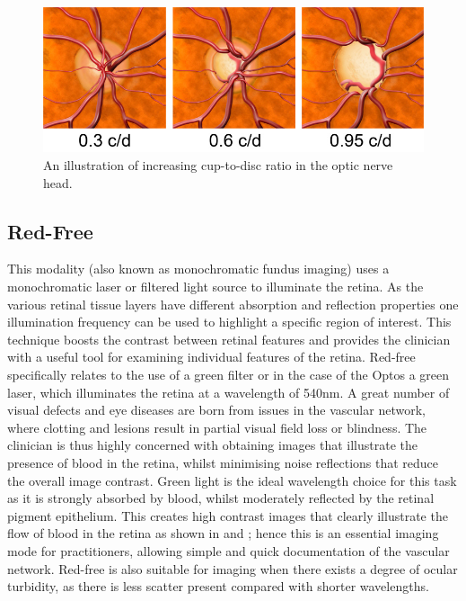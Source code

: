 \begin{figure}[H]
\centering
\includegraphics{figures/opticnervecupping}
\caption{An illustration of increasing cup-to-disc ratio in the optic nerve head.\cite{7_burnett_hodd_2012}}
\label{fig:cup}
   \end{figure}

	

\subsection{Red-Free}

This modality (also known as monochromatic fundus imaging) uses a
monochromatic \gls{laser} or filtered light source to illuminate the retina.
As the various retinal tissue layers have different absorption and
reflection properties one illumination frequency can be used to highlight
a specific region of interest. This technique boosts the contrast between
retinal features and provides the clinician with a useful tool for examining
individual features of the retina. Red-free specifically relates to the use of
a green filter or in the case of the Optos a green \Gls{laser}, which
illuminates the retina at a wavelength of 540nm.\cite{4_bennett_2015}
A great number of visual defects and eye diseases are born from issues in
the vascular network, where clotting and lesions result in partial visual
field loss or blindness. The clinician is thus highly concerned with obtaining
images that illustrate the presence of blood in the retina, whilst minimising
noise reflections that reduce the overall image contrast. Green light is the
ideal wavelength choice for this task as it is strongly absorbed by blood,
whilst moderately reflected by the retinal pigment epithelium. This creates
high contrast images that clearly illustrate the flow of blood in the retina
as shown in  and ; hence this is an essential
imaging mode for practitioners, allowing simple and quick documentation of
the vascular network. Red-free is also suitable for imaging when there exists
a degree of ocular turbidity, as there is less scatter present compared with
shorter wavelengths.

